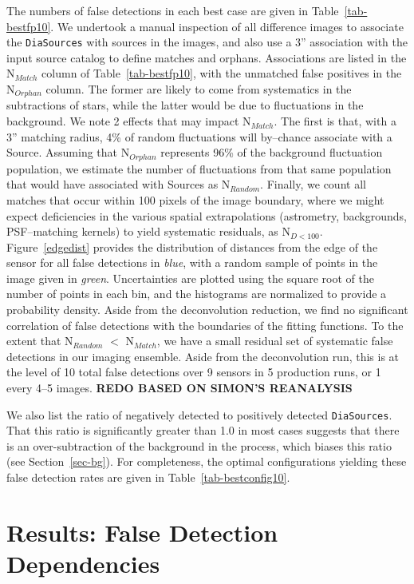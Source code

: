 \documentclass[prd, nofootinbib, floatfix, 11pt,tightenlines,times]{article}
\begin{document}
The numbers of false detections in each best case are given in
Table~\ref{tab-bestfp10}.  We undertook a manual inspection of all
difference images to associate the {\tt DiaSources} with sources in the
images, and also use a 3'' association with the input source catalog
to define matches and orphans.  Associations are listed in the
N$_{Match}$ column of Table~\ref{tab-bestfp10}, with the unmatched
false positives in the N$_{Orphan}$ column.  The former are likely to
come from systematics in the subtractions of stars, while the latter
would be due to fluctuations in the background.  We note 2 effects
that may impact N$_{Match}$.  The first is that, with a 3'' matching
radius, 4\% of random fluctuations will by--chance associate with a
Source.  Assuming that N$_{Orphan}$ represents 96\% of the background
fluctuation population, we estimate the number of fluctuations from
that same population that would have associated with Sources as
N$_{Random}$.  Finally, we count all matches that occur within 100
pixels of the image boundary, where we might expect deficiencies in
the various spatial extrapolations (astrometry, backgrounds,
PSF--matching kernels) to yield systematic residuals, as N$_{D<100}$.
Figure~\ref{edgedist} provides the distribution of distances from the
edge of the sensor for all false detections in {\it blue}, with a
random sample of points in the image given in {\it green}.
Uncertainties are plotted using the square root of the number of
points in each bin, and the histograms are normalized to provide a
probability density.  Aside from the deconvolution reduction, we find
no significant correlation of false detections with the boundaries of
the fitting functions.  To the extent that N$_{Random}$ $<$
N$_{Match}$, we have a small residual set of systematic false
detections in our imaging ensemble.  Aside from the deconvolution run,
this is at the level of 10 total false detections over 9 sensors in 5
production runs, or 1 every 4--5 images. {\bf REDO BASED ON SIMON'S REANALYSIS}

We also list the ratio of negatively detected to positively detected
{\tt DiaSources}.  That this ratio is significantly greater than 1.0 in most
cases suggests that there is an over-subtraction of the background in
the process, which biases this ratio (see Section~\ref{sec-bg}).  For
completeness, the optimal configurations yielding these false detection
rates are given in Table~\ref{tab-bestconfig10}.

\section{Results: False Detection Dependencies}
\end{document}
